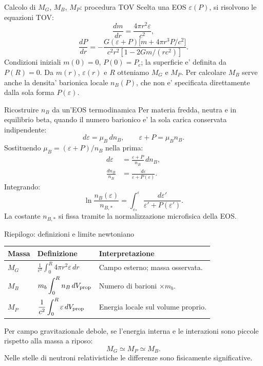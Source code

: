 \begin{frame}{Calcolo di $M_G$, $M_B$, $M_P$: procedura TOV}
\small
Scelta una EOS $\varepsilon(P)$, si risolvono le equazioni TOV:
\[
\frac{dm}{dr}=\frac{4\pi r^2\varepsilon}{c^2},
\]
\[
\frac{dP}{dr}=
-\frac{G(\varepsilon+P)
\bigl[m+4\pi r^3P/c^2\bigr]}
{c^2r^2[1-2Gm/(rc^2)]}.
\]
Condizioni iniziali $m(0)=0$, $P(0)=P_c$;
la superficie e' definita da $P(R)=0$.
\medskip
Da $m(r)$, $\varepsilon(r)$ e $R$ otteniamo $M_G$ e $M_P$.
\medskip
Per calcolare $M_B$ serve anche la densita' barionica locale $n_B(P)$,
che non e' specificata direttamente dalla sola forma $P(\varepsilon)$.
\end{frame}

\begin{frame}{Ricostruire $n_B$ da un'EOS termodinamica}
\small
Per materia fredda, neutra e in equilibrio beta,
quando il numero barionico e' la sola carica conservata indipendente:
\[
d\varepsilon=\mu_B\,dn_B,
\qquad
\varepsilon+P=\mu_Bn_B.
\]
Sostituendo $\mu_B=(\varepsilon+P)/n_B$ nella prima:
\[
\begin{aligned}
d\varepsilon&=\frac{\varepsilon+P}{n_B}\,dn_B,\\
\frac{dn_B}{n_B}&=\frac{d\varepsilon}{\varepsilon+P(\varepsilon)}.
\end{aligned}
\]
Integrando:
\[
\ln\frac{n_B(\varepsilon)}{n_{B,*}}
=\int_{\varepsilon_*}^{\varepsilon}
\frac{d\varepsilon'}{\varepsilon'+P(\varepsilon')}.
\]
La costante $n_{B,*}$ si fissa tramite la normalizzazione
microfisica della EOS.
\end{frame}

\begin{frame}{Riepilogo: definizioni e limite newtoniano}
\footnotesize
\renewcommand{\arraystretch}{1.5}
\begin{tabular}{@{}p{}p{}p{}@{}}
\hline
\textbf{Massa} & \textbf{Definizione} & \textbf{Interpretazione}\\
\hline
$M_G$ & $\displaystyle\frac{1}{c^2}\int_0^R4\pi r^2\varepsilon\,dr$
& Campo esterno; massa osservata.\\
$M_B$ & $\displaystyle m_b\int_0^R n_B\,dV_{\rm prop}$
& Numero di barioni $\times m_b$.\\
$M_P$ & $\displaystyle\frac{1}{c^2}\int_0^R\varepsilon\,dV_{\rm prop}$
& Energia locale sul volume proprio.\\
\hline
\end{tabular}
\medskip
Per campo gravitazionale debole, se l'energia interna e le interazioni
sono piccole rispetto alla massa a riposo:
\[
M_G\simeq M_P\simeq M_B.
\]
Nelle stelle di neutroni relativistiche le differenze
sono fisicamente significative.
\end{frame}

